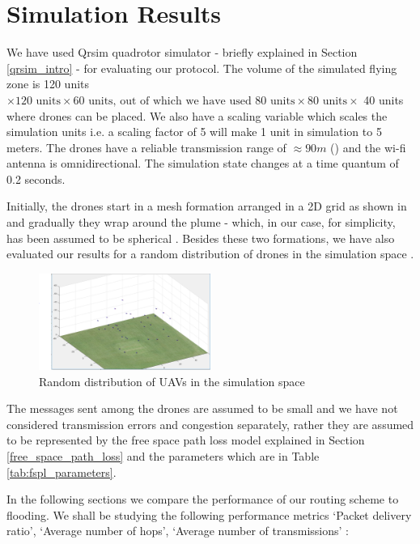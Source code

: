 \chapter{Simulation Results}
\newcommand\simResultFigSize{0.7}
\label{chap-five}

We have used Qrsim quadrotor simulator \cite{denardi2013rn} - briefly explained in Section \ref{qrsim_intro} - for evaluating our protocol. The volume of the simulated flying zone is 120 units $ \times \text{120 units} \times \text{60 units, out of which we have used 80 units} \times \text{80 units}\times $ 40 units where drones can be placed. We also have a scaling variable which scales the simulation units i.e. a scaling factor of 5 will make 1 unit in simulation to 5 meters. The drones have a reliable transmission range of $\approx 90 m$ () and the wi-fi antenna is omnidirectional. The simulation state changes at a time quantum of 0.2 seconds.

Initially, the drones start in a mesh formation arranged in a 2D grid as shown in  and gradually they wrap around the plume - which, in our case, for simplicity, has been assumed to be spherical . Besides these two formations, we have also evaluated our results for a random distribution of drones in the simulation space .

\begin{figure}[hbtp]
\centering
\includegraphics[width=0.5\textwidth]{ncsuthesis-0.6/Chapter-5/figs/random_drone_locations}
\caption{Random distribution of UAVs in the simulation space}
\label{fig:random_formation}
\end{figure}

The messages sent among the drones are assumed to be small and we have not considered transmission errors and congestion separately, rather they are assumed to be represented by the free space path loss model explained in Section \ref{free_space_path_loss} and the parameters which are in Table \ref{tab:fspl_parameters}. 

In the following sections we compare the performance of our routing scheme to flooding. We shall be studying the following performance metrics `Packet delivery ratio', `Average number of hops', `Average number of transmissions' \cite{OUBBATI201729}:

